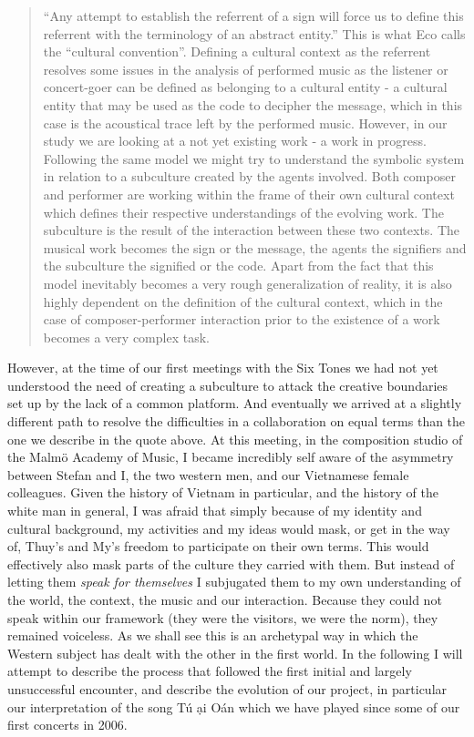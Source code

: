 \documentclass[a4paper]{article}
\begin{document}
\begin{quote}
  ``Any attempt to establish the referrent of a sign will force us to define this referrent with   the terminology of an abstract entity.'' This is what Eco calls the ``cultural convention''.   \cite[p. 61-6]{eco71} Defining a cultural context as the referrent resolves some issues in   the analysis of performed music as the listener or concert-goer can be defined as belonging to   a cultural entity - a cultural entity that may be used as the code to decipher the message,   which in this case is the acoustical trace left by the performed music. However, in our study   we are looking at a not yet existing work - a work in progress. Following the same model we   might try to understand the symbolic system in relation to a subculture created by the agents   involved.  Both composer and performer are working within the frame of their own cultural   context which defines their respective understandings of the evolving work. The subculture is   the result of the interaction between these two contexts. The musical work becomes the sign or   the message, the agents the signifiers and the subculture the signified or the code. Apart   from the fact that this model inevitably becomes a very rough generalization     of reality, it is also highly dependent on the definition of the cultural context, which in   the case of composer-performer interaction prior to the existence of a work becomes a very   complex task.  \citep{frisk-ost06-2}
\end{quote}

However, at the time of our first meetings with the Six Tones we had not yet understood the need of creating a subculture to attack the creative boundaries set up by the lack of a common platform. And eventually we arrived at a slightly different path to resolve the difficulties in a collaboration on  equal terms than the one we describe in the quote above. At this meeting, in the composition studio of the Malmö Academy of Music, I became incredibly self aware of the asymmetry between Stefan and I, the two western men, and our Vietnamese female colleagues. Given the history of Vietnam in particular, and the history of the white man in general, I was afraid that simply because of my identity and cultural background, my activities and my ideas would mask, or get in the way of, Thuy's and My's freedom to participate on their own terms. This would effectively also mask parts of the culture they carried with them. But instead of letting them \emph{speak for themselves} I subjugated them to my own understanding of the world, the context, the music and our interaction. Because they could not speak within our framework (they were the visitors, we were the norm), they remained voiceless. As we shall see this is an archetypal way in which the Western subject has dealt with the other in the first world. In the following I will attempt to describe the process that followed the first initial and largely unsuccessful encounter, and describe the evolution of our project, in particular our interpretation of the song T\'{u} \DH \d{a}i O\'{a}n which we have played since some of our first concerts in 2006. 
\end{document}
